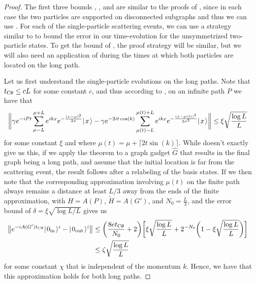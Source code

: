 \documentclass[../thesis-main/thesis-main]{subfiles}
\begin{document}
\begin{proof}
The first three bounds , , and  are similar to the proofs of , since in each case the two particles are supported on disconnected subgraphs and thus we can use .  For each of the single-particle scattering events, we can use a strategy similar to  to bound the error in our time-evolution for the unsymmetrized two-particle states.  To get the bound of , the proof strategy will be similar, but we will also need an application of  during the times at which both particles are located on the long path.


Let us first understand the single-particle evolutions on the long paths. Note that $t_{\mathrm{C}\theta} \leq c L$ for some constant $c$, and thus according to , on an infinite path $P$ we have that
\begin{align}
  \bigg\Vert \gamma e^{- i P t } \sum_{\mu-L}^{\mu+L} e^{i k x} e^{-  \frac{(x-\mu)^2}{2\sigma} }|\mspace{2mu} x \mspace{2mu} \rangle - \gamma  e^{-2i t \cos(k)} \sum_{\mu(t) - L}^{\mu(t) + L} e^{ i k x} e^{- \frac{(x-\mu(t))^2}{2\sigma^2}} |\mspace{2mu} x \mspace{2mu} \rangle \bigg\Vert \leq \xi \sqrt{\frac{ \log L}{L}}
\end{align}
for some constant $\xi$ and where $\mu(t) = \mu + \lceil 2 t \sin(k)\rceil$.  While  doesn't exactly give us this, if we apply the theorem to a graph gadget $\widehat{G}$ that results in the final graph being a long path, and assume that the initial location is far from the scattering event, the result follows after a relabeling of the basis states.  If we then note that the corresponding approximation involving $\mu(t)$ on the finite path always remains a distance at least $L/3$ away from the ends of the finite approximation,  with $H = A(P)$, $\tilde{H} = A(G')$, and $N_0 = \frac{L}{3}$, and the error bound of $\delta =\xi \sqrt{\log L/L}$ gives us
\begin{align}
  \big\Vert e^{-i A(G') t_{\mathrm{C}\theta}} |\mspace{2mu} 0_{\text{in}} \mspace{2mu} \rangle^i - |\mspace{2mu} 0_\text{out} \mspace{2mu} \rangle^i\big\Vert &\leq \bigg( \frac{ 8 e t_{\mathrm{C}\theta}}{N_0} + 2 \bigg) \bigg[\xi \sqrt{\frac{\log L}{L}} + 2^{- N_0} \bigg( 1 - \xi \sqrt{\frac{\log L}{L}}\bigg)\bigg]\\
  & \leq \zeta \sqrt{ \frac{\log L}{L}}
\end{align}
for some constant $\chi$ that is independent of the momentum $k$.  Hence, we have that this approximation holds for both long paths.



\end{proof}
\end{document}
